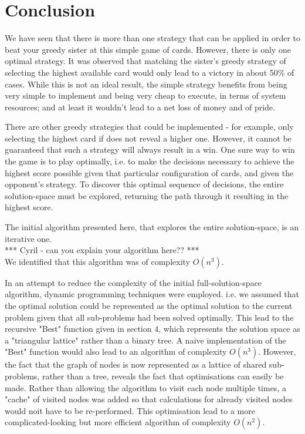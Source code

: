 \documentclass[11pt]{article}
\begin{document}
\section{Conclusion}

We have seen that there is more than one strategy that can be applied in order to beat your greedy sister at this simple game of cards. However, there is only one optimal strategy. It was observed that matching the sister's greedy strategy of selecting the highest available card would only lead to a victory in about 50\% of cases. While this is not an ideal result, the simple strategy benefits from being very simple to implement and being very cheap to execute, in terms of system resources; and at least it wouldn't lead to a net loss of money and of pride.

There are other greedy strategies that could be implemented - for example, only selecting the highest card if does not reveal a higher one. However, it cannot be guaranteed that such a strategy will always result in a win. One sure way to win the game is to play optimally, i.e. to make the decisions necessary to achieve the highest score possible given that particular configuration of cards, and given the opponent's strategy. To discover this optimal sequence of decisions, the entire solution-space must be explored, returning the path through it resulting in the highest score.

The initial algorithm presented here, that explores the entire solution-space, is an iterative one.\\
*** Cyril - can you explain your algorithm here?? ***\\
We identified that this algorithm was of complexity $O(n^3)$.

In an attempt to reduce the complexity of the initial full-solution-space algorithm, dynamic programming techniques were employed. i.e. we assumed that the optimal solution could be represented as the optimal solution to the current problem given that all sub-problems had been solved optimally. This lead to the recursive "Best" function given in section 4, which represents the solution space as a "triangular lattice" rather than a binary tree. A naive implementation of the "Best" function would also lead to an algorithm of complexity $O(n^3)$. However, the fact that the graph of nodes is now represented as a lattice of shared sub-problems, rather than a tree, reveals the fact that optimisations can easily be made. Rather than allowing the algorithm to visit each node multiple times, a "cache" of visited nodes was added so that calculations for already visited nodes would noit have to be re-performed. This optimisation lead to a more complicated-looking but more efficient algorithm of complexity $O(n^2)$.



\end{document}
